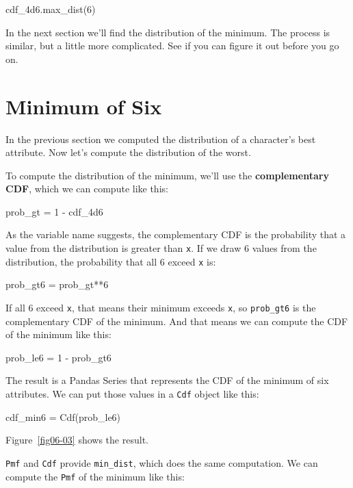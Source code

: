 \documentclass[12pt]{book}
\theoremstyle{exercise}
\newcommand{\py}[1]{{\tt #1}}%
\begin{document}
\begin{code}
cdf_4d6.max_dist(6)
\end{code}

In the next section we'll find the distribution of the minimum.
The process is similar, but a little more complicated.
See if you can figure it out before you go on.




%
%

\section{Minimum of Six}

In the previous section we computed the distribution of a character's best attribute.
Now let's compute the distribution of the worst.

To compute the distribution of the minimum, we'll use the {\bf complementary CDF}, which we can compute like this:

\begin{code}
prob_gt = 1 - cdf_4d6
\end{code}

As the variable name suggests, the complementary CDF is the probability that a value from the distribution is greater than \py{x}.
If we draw 6 values from the distribution, the probability that all 6 exceed \py{x} is:

\begin{code}
prob_gt6 = prob_gt**6
\end{code}

If all 6 exceed \py{x}, that means their minimum exceeds \py{x}, so \py{prob_gt6} is the complementary CDF of the minimum.
And that means we can compute the CDF of the minimum like this:

\begin{code}
prob_le6 = 1 - prob_gt6
\end{code}

The result is a Pandas Series that represents the CDF of the minimum of six attributes.
We can put those values in a \py{Cdf} object like this:

\begin{code}
cdf_min6 = Cdf(prob_le6)
\end{code}

Figure~\ref{fig06-03} shows the result.

\py{Pmf} and \py{Cdf} provide \py{min_dist}, which does the same computation.
We can compute the \py{Pmf} of the minimum like this:
\end{document}
